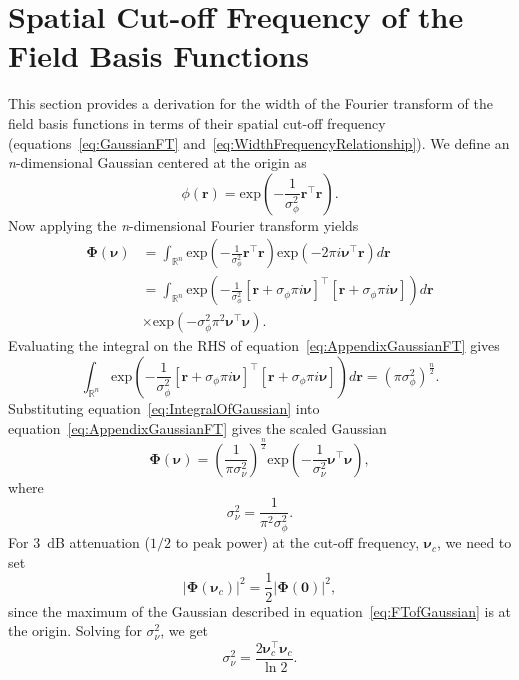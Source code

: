 \documentclass[5p,authoryear]{elsarticle}
\begin{document}
\section{Spatial Cut-off Frequency of the Field Basis Functions}\label{App:FrequencyAnalysis}
This section provides a derivation for the width of the Fourier transform of the field basis functions in terms of their spatial cut-off frequency (equations~\ref{eq:GaussianFT} and~\ref{eq:WidthFrequencyRelationship}). We define an \textit{n}-dimensional Gaussian centered at the origin as 
\begin{equation}
 \phi(\mathbf r)=\mathrm{exp}\left(-\frac{1}{\sigma_{\phi}^2}\mathbf r^\top\mathbf r\right).
\end{equation}
Now applying the \textit{n}-dimensional Fourier transform yields
\begin{align}\label{eq:AppendixGaussianFT}
 \boldsymbol\Phi(\boldsymbol \nu)&=\int_{\mathbb{R}^n} {\mathrm{exp}\left({-\frac{1}{\sigma_{\phi}^2}\mathbf r^\top\mathbf r}\right)\mathrm{exp}\left(-2\pi i\boldsymbol\nu^\top\mathbf r\right)d\mathbf r} \nonumber \\
&=\int_{\mathbb{R}^n}\mathrm{exp}\left(-\frac{1}{\sigma_{\phi}^2}\left[\mathbf r +\sigma_{\phi}\pi i \boldsymbol\nu\right]^\top\left[\mathbf r +\sigma_{\phi}\pi i \boldsymbol\nu\right]\right)d\mathbf r \nonumber \\ &\times\mathrm{exp}\left(-\sigma_{\phi}^2\pi^2\boldsymbol\nu^\top \boldsymbol\nu\right).
\end{align}
Evaluating the integral on the RHS of equation~\ref{eq:AppendixGaussianFT} gives 
\begin{equation}\label{eq:IntegralOfGaussian}
\int_{\mathbb{R}^n}\mathrm{exp}\left(-\frac{1}{\sigma_{\phi}^2}\left[\mathbf r +\sigma_{\phi}\pi i \boldsymbol\nu\right]^\top\left[\mathbf r +\sigma_{\phi}\pi i \boldsymbol\nu\right]\right)d\mathbf r
=\left(\pi\sigma_{\phi}^2\right)^{\frac{n}{2}}.
\end{equation}
Substituting equation~\ref{eq:IntegralOfGaussian} into equation~\ref{eq:AppendixGaussianFT} gives the scaled Gaussian
\begin{equation}\label{eq:FTofGaussian}
\boldsymbol\Phi(\boldsymbol \nu)=\left(\frac{1}{\pi\sigma_{\nu}^2}\right)^{\frac{n}{2}}\mathrm{exp}\left(-\frac{1}{\sigma_{\nu}^2}\boldsymbol\nu^\top \boldsymbol\nu\right),
\end{equation} 
where 
\begin{equation}
	\sigma_{\nu}^2=\frac{1}{\pi^2\sigma_{\phi}^2}. 
\end{equation}
For $3$~dB attenuation ($1/2$ to peak power) at the cut-off frequency, $\boldsymbol\nu_c$, we need to set
\begin{equation}
 \left|\boldsymbol\Phi(\boldsymbol\nu_{c})\right|^2=\frac{1}{2}\left|\boldsymbol\Phi(\mathbf 0)\right|^2,
\end{equation}
since the maximum of the Gaussian described in equation~\ref{eq:FTofGaussian} is at the origin. Solving for $\sigma_{\nu}^2$, we get
\begin{equation}
 \sigma_{\nu}^2=\frac{2\boldsymbol\nu_{c}^\top \boldsymbol\nu_{c}}{\ln 2 }.
\end{equation}
\end{document}
